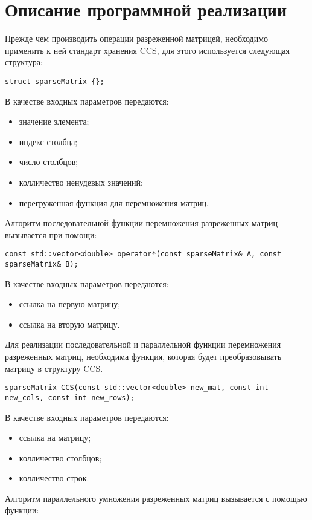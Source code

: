 \documentclass{report}
\begin{document}
\section*{Описание программной реализации}
Прежде чем производить операции разреженной матрицей, необходимо применить к ней стандарт хранения CCS, для этого используется следующая структура:
\begin{lstlisting}
struct sparseMatrix {};
\end{lstlisting}
\par В качестве входных параметров передаются:
\begin{itemize}
\item значение элемента;
\item индекс столбца;
\item число столбцов;
\item колличество ненудевых значений;
\item перегруженная функция для перемножения матриц.
\end{itemize}
\par Алгоритм последовательной функции перемножения разреженных матриц вызывается при помощи:
\begin{lstlisting}
const std::vector<double> operator*(const sparseMatrix& A, const sparseMatrix& B);
\end{lstlisting}
\par В качестве входных параметров передаются:
\begin{itemize}
\item ссылка на первую матрицу;
\item ссылка на вторую матрицу.
\end{itemize}
\par Для реализации последовательной и параллельной функции перемножения разреженных матриц, необходима функция, которая будет преобразовывать матрицу в структуру CCS.
\begin{lstlisting}
sparseMatrix CCS(const std::vector<double> new_mat, const int new_cols, const int new_rows);
\end{lstlisting}
\par В качестве входных параметров передаются:
\begin{itemize}
\item ссылка на матрицу;
\item колличество столбцов;
\item колличество строк.
\end{itemize}
\par Алгоритм параллельного умножения разреженных матриц вызывается с помощью функции:
\end{document}
